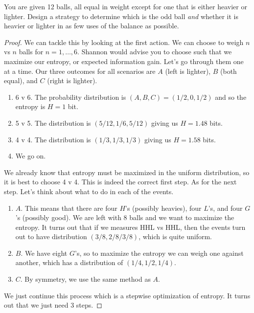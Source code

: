 \documentclass{article}
\begin{document}
    \begin{exercise}
      You are given 12 balls, all equal in weight except for one that is either heavier or lighter. Design a strategy to determine which is the odd ball \textit{and} whether it is heavier or lighter in as few uses of the balance as possible. 
    \end{exercise}

    \begin{proof}
      We can tackle this by looking at the first action. We can choose to weigh $n$ vs $n$ balls for $n = 1, \ldots, 6$. Shannon would advise you to choose such that we maximize our entropy, or expected information gain. Let's go through them one at a time. Our three outcomes for all scenarios are $A$ (left is lighter), $B$ (both equal), and $C$ (right is lighter). 
      \begin{enumerate}
        \item 6 v 6. The probability distribution is $(A, B, C) = (1/2, 0, 1/2)$ and so the entropy is $H = 1$ bit. 
        \item 5 v 5. The distribution is $(5/12, 1/6, 5/12)$ giving us $H = 1.48$ bits. 
        \item 4 v 4. The distribution is $(1/3, 1/3, 1/3)$ giving us $H = 1.58$ bits. 
        \item We go on. 
      \end{enumerate}
      We already know that entropy must be maximized in the uniform distribution, so it is best to choose 4 v 4. This is indeed the correct first step. As for the next step. Let's think about what to do in each of the events. 
      \begin{enumerate}
        \item $A$. This means that there are four $H$'s (possibly heavies), four $L$'s, and four $G$'s (possibly good). We are left with 8 balls and we want to maximize the entropy. It turns out that if we measures HHL vs HHL, then the events turn out to have distribution $(3/8, 2/8/ 3/8)$, which is quite uniform.  
        \item $B$. We have eight $G$'s, so to maximize the entropy we can weigh one against another, which has a distribution of $(1/4, 1/2, 1/4)$. 
        \item $C$. By symmetry, we use the same method as $A$. 
      \end{enumerate}
      We just continue this process which is a stepwise optimization of entropy. It turns out that we just need 3 steps. 
    \end{proof}
\end{document}
